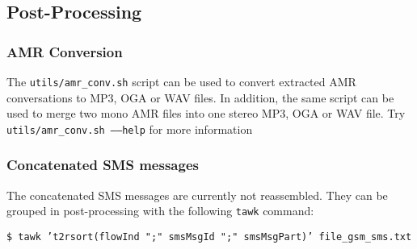 \documentclass[documentation]{subfiles}
\begin{document}
\subsection{Post-Processing}

\subsubsection{AMR Conversion}
The {\tt utils/amr\_conv.sh} script can be used to convert extracted AMR conversations to MP3, OGA or WAV files. In addition, the same script can be used to merge two mono AMR files into one stereo MP3, OGA or WAV file. Try {\tt utils/amr\_conv.sh --{}--help} for more information

\subsubsection{Concatenated SMS messages}
The concatenated SMS messages are currently not reassembled.
They can be grouped in post-processing with the following {\tt tawk} command:
\begin{center}
    {\tt \$ tawk 't2rsort(flowInd ";" smsMsgId ";" smsMsgPart)' file\_gsm\_sms.txt}
\end{center}
\end{document}
